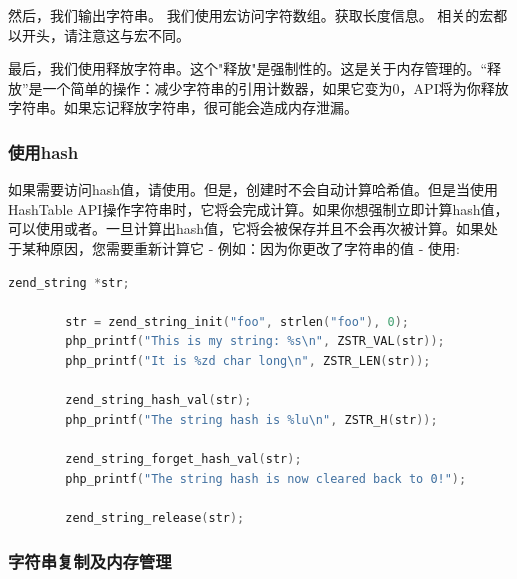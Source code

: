 
然后，我们输出字符串。 我们使用宏访问字符数组。获取长度信息。 相关的宏都以开头，请注意这与宏不同。


最后，我们使用释放字符串。这个"释放"是强制性的。这是关于内存管理的。“释放”是一个简单的操作：减少字符串的引用计数器，如果它变为0，API将为你释放字符串。如果忘记释放字符串，很可能会造成内存泄漏。


\subsubsection{使用hash}

如果需要访问hash值，请使用。但是，创建时不会自动计算哈希值。但是当使用HashTable API操作字符串时，它将会完成计算。如果你想强制立即计算hash值，可以使用或者。一旦计算出hash值，它将会被保存并且不会再次被计算。如果处于某种原因，您需要重新计算它 - 例如：因为你更改了字符串的值 - 使用:



\begin{lstlisting}[language=c]
        zend_string *str;

        str = zend_string_init("foo", strlen("foo"), 0);
        php_printf("This is my string: %s\n", ZSTR_VAL(str));
        php_printf("It is %zd char long\n", ZSTR_LEN(str));
        
        zend_string_hash_val(str);
        php_printf("The string hash is %lu\n", ZSTR_H(str));
        
        zend_string_forget_hash_val(str);
        php_printf("The string hash is now cleared back to 0!");
        
        zend_string_release(str);
\end{lstlisting}


\subsubsection{字符串复制及内存管理}



